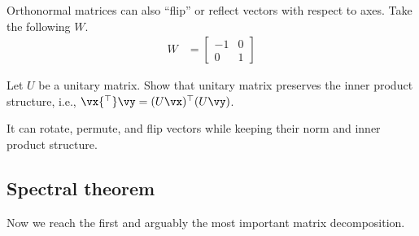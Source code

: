 \documentclass[a4paper,11pt]{exam}
\newcounter{ct}
\newcommand{\trp}{{^\top}} %
\begin{document}
\begin{questions}

\question Orthonormal matrices can also ``flip'' or reflect vectors with respect to axes. Take the following $W$.
\begin{align}\label{eq:LA:flip}
    W &=
    \begin{bmatrix}
	-1 & 0\\
	 0 & 1
    \end{bmatrix}
\end{align}

\question Let $U$ be a unitary matrix. Show that unitary matrix preserves the inner product structure, i.e., $\vx\trp \vy = (U \vx)\trp (U\vy)$.

\begin{tcolorbox}[colback=black!1!,title=Unitary Matrix]
    It can rotate, permute, and flip vectors while keeping their norm and inner product structure.
\end{tcolorbox}

\clearpage
\subsection{Spectral theorem}
Now we reach the first and arguably the most important matrix decomposition.


\end{questions}
\end{document}
